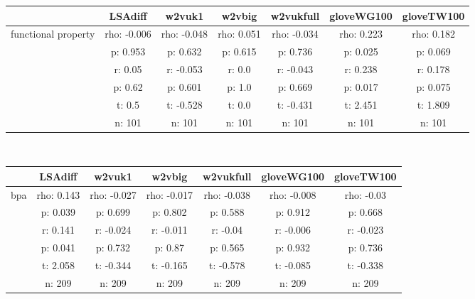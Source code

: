 \documentclass{article}
\begin{document}
\begin{tabular}{ccccccc|}\cline{2-7}
&\multicolumn{1}{|c}{LSAdiff} & w2vuk1 & w2vbig & w2vukfull & gloveWG100 & gloveTW100 \\\hline
\multicolumn{1}{|c|}{\multirow{6}{*}{functional property}} & rho: -0.006 & rho: -0.048 & rho: 0.051 & rho: -0.034 & rho: 0.223 & rho: 0.182 \\
\multicolumn{1}{|c|}{} & p: 0.953 & p: 0.632 & p: 0.615 & p: 0.736 & p: 0.025 & p: 0.069 \\
\multicolumn{1}{|c|}{} & r: 0.05 & r: -0.053 & r: 0.0 & r: -0.043 & r: 0.238 & r: 0.178 \\
\multicolumn{1}{|c|}{} & p: 0.62 & p: 0.601 & p: 1.0 & p: 0.669 & p: 0.017 & p: 0.075 \\
\multicolumn{1}{|c|}{} & t: 0.5 & t: -0.528 & t: 0.0 & t: -0.431 & t: 2.451 & t: 1.809 \\
\multicolumn{1}{|c|}{} & n: 101 & n: 101 & n: 101 & n: 101 & n: 101 & n: 101 \\
\hline
\end{tabular}\\
\begin{tabular}{ccccccc|}\cline{2-7}
&\multicolumn{1}{|c}{LSAdiff} & w2vuk1 & w2vbig & w2vukfull & gloveWG100 & gloveTW100 \\\hline
\multicolumn{1}{|c|}{\multirow{6}{*}{bpa}} & rho: 0.143 & rho: -0.027 & rho: -0.017 & rho: -0.038 & rho: -0.008 & rho: -0.03 \\
\multicolumn{1}{|c|}{} & p: 0.039 & p: 0.699 & p: 0.802 & p: 0.588 & p: 0.912 & p: 0.668 \\
\multicolumn{1}{|c|}{} & r: 0.141 & r: -0.024 & r: -0.011 & r: -0.04 & r: -0.006 & r: -0.023 \\
\multicolumn{1}{|c|}{} & p: 0.041 & p: 0.732 & p: 0.87 & p: 0.565 & p: 0.932 & p: 0.736 \\
\multicolumn{1}{|c|}{} & t: 2.058 & t: -0.344 & t: -0.165 & t: -0.578 & t: -0.085 & t: -0.338 \\
\multicolumn{1}{|c|}{} & n: 209 & n: 209 & n: 209 & n: 209 & n: 209 & n: 209 \\
\hline
\end{tabular}\\
\end{document}
